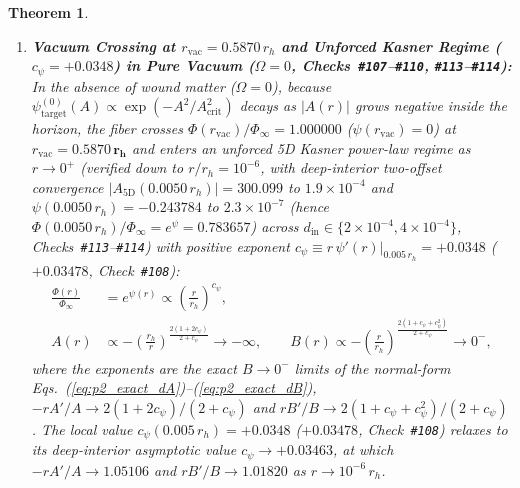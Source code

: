\documentclass[11pt,a4paper]{article}
\theoremstyle{plain}
\newtheorem{theorem}{Theorem}[section]
\theoremstyle{definition}
\theoremstyle{remark}
\numberwithin{equation}{section}
\begin{document}
\begin{theorem}
\begin{enumerate}
    \item[\textnormal{(iii)}] \textbf{Vacuum Crossing at $r_{\text{vac}} = 0.5870\,r_h$ and Unforced Kasner Regime ($c_{\psi} = +0.0348$) in Pure Vacuum ($\Omega = 0$, Checks~\texttt{\#107}--\texttt{\#110}, \texttt{\#113}--\texttt{\#114}):} In the absence of wound matter ($\Omega = 0$), because $\psi_{\text{target}}^{(0)}(A) \propto \exp(-A^2/A_{\text{crit}}^2)$ decays as $|A(r)|$ grows negative inside the horizon, the fiber crosses $\Phi(r_{\text{vac}})/\Phi_{\infty} = 1.000000$ ($\psi(r_{\text{vac}}) = 0$) at $r_{\text{vac}} = \mathbf{0.5870\,r_h}$ and enters an unforced 5D Kasner power-law regime as $r \to 0^+$ (verified down to $r/r_h = 10^{-6}$, with deep-interior two-offset convergence $|A_{\text{5D}}(0.0050\,r_h)| = 300.099$ to $1.9 \times 10^{-4}$ and $\psi(0.0050\,r_h) = -0.243784$ to $2.3 \times 10^{-7}$ (hence $\Phi(0.0050\,r_h)/\Phi_{\infty} = e^{\psi} = 0.783657$) across $d_{\text{in}} \in \{2\times 10^{-4}, 4\times 10^{-4}\}$, Checks~\texttt{\#113}--\texttt{\#114}) with positive exponent $c_{\psi} \equiv r\,\psi'(r)\big|_{0.005\,r_h} = \mathbf{+0.0348}$ ($+0.03478$, Check~\texttt{\#108}):
    \begin{align}
      \frac{\Phi(r)}{\Phi_{\infty}} &= e^{\psi(r)} \propto \left(\frac{r}{r_h}\right)^{c_{\psi}}, \nonumber \\[3pt]
      A(r) &\propto -\left(\frac{r_h}{r}\right)^{\frac{2(1 + 2c_{\psi})}{2 + c_{\psi}}} \to -\infty, \qquad
      B(r) \propto -\left(\frac{r}{r_h}\right)^{\frac{2(1 + c_{\psi} + c_{\psi}^2)}{2 + c_{\psi}}} \to 0^-,
      \label{eq:kasner_power_laws}
    \end{align}
    where the exponents are the exact $B \to 0^-$ limits of the normal-form Eqs.~(\ref{eq:p2_exact_dA})--(\ref{eq:p2_exact_dB}), $-r A'/A \to 2(1 + 2c_{\psi})/(2 + c_{\psi})$ and $r B'/B \to 2(1 + c_{\psi} + c_{\psi}^2)/(2 + c_{\psi})$. The local value $c_{\psi}(0.005\,r_h) = +0.0348$ ($+0.03478$, Check~\texttt{\#108}) relaxes to its deep-interior asymptotic value $c_{\psi} \to +0.03463$, at which $-r A'/A \to 1.05106$ and $r B'/B \to 1.01820$ as $r \to 10^{-6}\,r_h$.

\end{enumerate}
\end{theorem}
\end{document}
